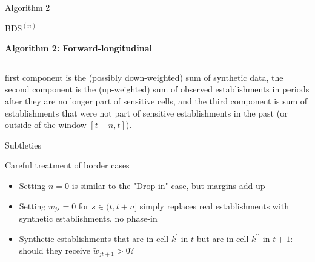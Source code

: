 
\begin{frame}[fragile]{Algorithm 2}
	

	\begin{block}{BDS$^{(ii)}$}
\begin{algorithm}
{\bf Algorithm 2: Forward-longitudinal}
\hrule
\label{algorithm:2}
\begin{algorithmic}
\alert<1>{    
    }
\EndIf
{}

\end{algorithmic}
\end{algorithm}
first component is the (possibly down-weighted) sum of synthetic data, the second 
component is the (up-weighted) sum of observed establishments in periods after they are no 
longer part of sensitive cells, and the third component is sum of establishments that were not 
part of sensitive establishments in the past (or outside of the window $[t-n,t]$).
	\end{block}
\end{frame}

\begin{frame}{Subtleties}

\begin{block}{Careful treatment of border cases}
\begin{itemize}
	\item Setting $n=0$ is similar to the "Drop-in" case, but margins add up
	\item Setting $w_{js} = 0$ for $s \in (t,t+n]$ simply replaces real establishments with synthetic establishments, no phase-in
	\item Synthetic establishments that are in cell $k^\prime$ in $t$ but are in cell $k^{\prime \prime}$ in $t+1$: should they receive $\tilde{w}_{jt+1}>0$?
\end{itemize}
\end{block}
\end{frame}



